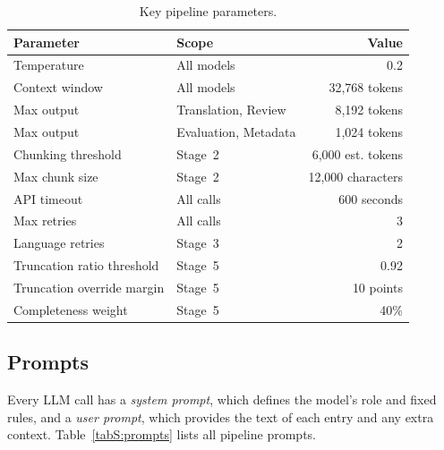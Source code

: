 \documentclass[11pt]{article}
\begin{document}
\begin{table}[h!]
\centering
\caption{Key pipeline parameters.}
\label{tabS:parameters}
\footnotesize
\begin{tabular}{llr}
\toprule
\textbf{Parameter} & \textbf{Scope} & \textbf{Value} \\
\midrule
Temperature & All models & 0.2 \\
Context window & All models & 32,768 tokens \\
Max output & Translation, Review & 8,192 tokens \\
Max output & Evaluation, Metadata & 1,024 tokens \\
Chunking threshold & Stage~2 & 6,000 est. tokens \\
Max chunk size & Stage~2 & 12,000 characters \\
API timeout & All calls & 600 seconds \\
Max retries & All calls & 3 \\
Language retries & Stage~3 & 2 \\
Truncation ratio threshold & Stage~5 & 0.92 \\
Truncation override margin & Stage~5 & 10 points \\
Completeness weight & Stage~5 & 40\% \\
\bottomrule
\end{tabular}
\end{table}

\subsection{Prompts}
\label{secS:prompts}

Every LLM call has a \emph{system prompt}, which defines the model's role and fixed rules, and a \emph{user prompt}, which provides the text of each entry and any extra context. Table~\ref{tabS:prompts} lists all pipeline prompts.
\end{document}
